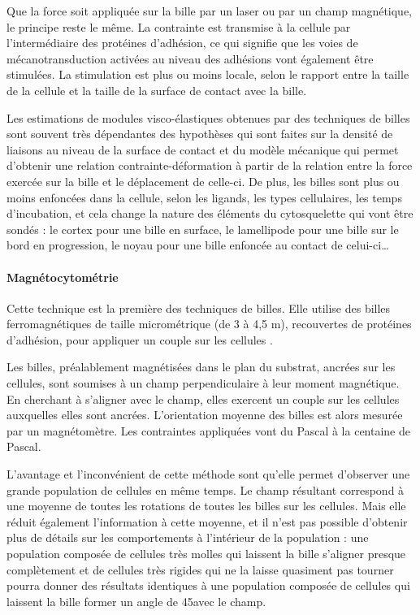 Que la force soit appliquée sur la bille par un laser ou par un champ magnétique, le principe reste le même. La contrainte est transmise à la cellule par l'intermédiaire des protéines d'adhésion, ce qui signifie que les voies de mécanotransduction activées au niveau des adhésions vont également être stimulées. 
La stimulation est plus ou moins locale, selon le rapport entre la taille de la cellule et la taille de la surface de contact avec la bille.

Les estimations de modules visco-élastiques obtenues par des techniques de billes sont souvent très dépendantes des hypothèses qui sont faites sur la densité de liaisons au niveau de la surface de contact et du modèle mécanique qui permet d'obtenir une relation contrainte-déformation à partir de la relation entre la force exercée sur la bille et le déplacement de celle-ci. 
De plus, les billes sont plus ou moins enfoncées dans la cellule, selon les ligands, les types cellulaires, les temps d'incubation, et cela change la nature des éléments du cytosquelette qui vont être sondés : le cortex pour une bille en surface, le lamellipode pour une bille sur le bord en progression, le noyau pour une bille enfoncée au contact de celui-ci\dots


\paragraph{Magnétocytométrie}

Cette technique est la première des techniques de billes. Elle utilise des billes ferromagnétiques de taille micrométrique (de 3 à 4,5 \micro m), recouvertes de protéines d'adhésion, pour appliquer un couple sur les cellules \parencite{wang_mechanotransduction_1993}.

Les billes, préalablement magnétisées dans le plan du substrat, ancrées sur les cellules, sont soumises à un champ perpendiculaire à leur moment magnétique. En cherchant à s'aligner avec le champ, elles exercent un couple sur les cellules auxquelles elles sont ancrées. L'orientation moyenne des billes est alors mesurée par un magnétomètre. Les contraintes appliquées vont du Pascal à la centaine de Pascal. 

L'avantage et l'inconvénient de cette méthode sont qu'elle permet d'observer une grande population de cellules en même temps. Le champ résultant correspond à une moyenne de toutes les rotations de toutes les billes sur les cellules. Mais elle réduit également l'information à cette moyenne, et il n'est pas possible d'obtenir plus de détails sur les comportements à l'intérieur de la population : une population composée de cellules très molles qui laissent la bille s'aligner presque complètement et de cellules très rigides qui ne la laisse quasiment pas tourner pourra donner des résultats identiques à une population composée de cellules qui laissent la bille former un angle de 45\degres avec le champ. 

